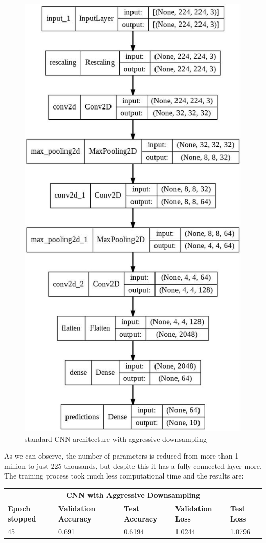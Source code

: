 \begin{figure}[H]
	\centering
	\includegraphics[height=0.8\textwidth]{img/scratch/aggressive_downsampling.jpg}
	\caption{standard CNN architecture with aggressive downsampling}
	\label{fig: AggressiveDownsamplingCNN}
\end{figure}

\noindent As we can observe, the number of parameters is reduced from more than 1 million to just 225 thousands, but despite this it has a fully connected layer more. The training process took much less computational time and the results are: 

\medskip

\begin{tabular}{ |p{2cm}|p{2cm}|p{2cm}|p{2cm}|p{2cm}|  }
\hline
\multicolumn{5}{|c|}{CNN with Aggressive Downsampling} \\
\hline
\textbf{Epoch stopped} & \textbf{Validation Accuracy} & \textbf{Test Accuracy} & \textbf{Validation Loss} & \textbf{Test Loss} \\
\hline
45 & 0.691 & 0.6194 & 1.0244 & 1.0796\\
\hline
\end{tabular}

\medskip


